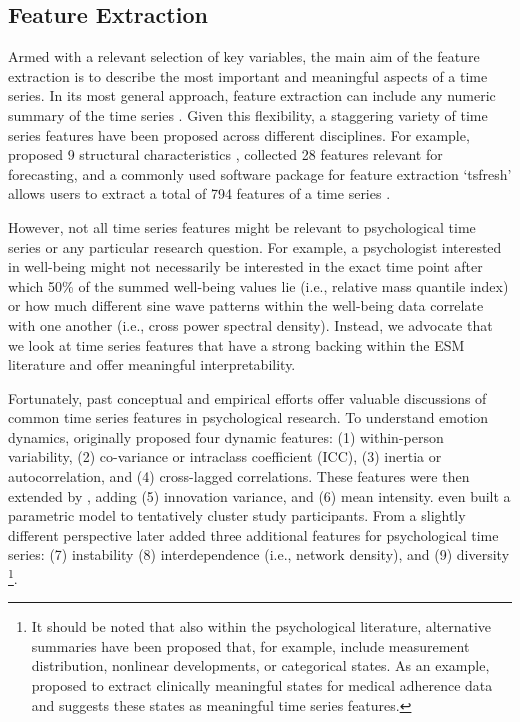 \documentclass[man, 12pt, a4paper, floatsintext]{apa7}
\theoremstyle{break}
\theoremstyle{plain}
\begin{document}



\subsection{Feature Extraction}
Armed with a relevant selection of key variables, the main aim of the feature extraction is to describe the most important and meaningful aspects of a time series. In its most general approach, feature extraction can include any numeric summary of the time series \citep[e.g.,][]{maharaj2019}. Given this flexibility, a staggering variety of time series features have been proposed across different disciplines. For example, \citet{wang2006} proposed 9 structural characteristics \citep[also see][]{fulcher2013}, \citet{adya2001} collected 28 features relevant for forecasting, and a commonly used software package for feature extraction `tsfresh' allows users to extract a total of 794 features of a time series \citep[][]{christ2018}. 

However, not all time series features might be relevant to psychological time series or any particular research question. For example, a psychologist interested in well-being might not necessarily be interested in the exact time point after which 50\% of the summed well-being values lie (i.e., relative mass quantile index) or how much different sine wave patterns within the well-being data correlate with one another (i.e., cross power spectral density). Instead, we advocate that we look at time series features that have a strong backing within the ESM literature and offer meaningful interpretability. 

Fortunately, past conceptual and empirical efforts offer valuable discussions of common time series features in psychological research. To understand emotion dynamics, \citet{kuppens2017} originally proposed four dynamic features: (1) within-person variability, (2) co-variance or intraclass coefficient (ICC), (3) inertia or autocorrelation, and (4) cross-lagged correlations. These features were then extended by \citet{krone2018}, adding (5) innovation variance, and (6) mean intensity. \citet{krone2018} even built a parametric model to tentatively cluster study participants. From a slightly different perspective \citet{dejonckheere2019} later added three additional features for psychological time series: (7) instability (8) interdependence (i.e., network density), and (9) diversity \citep[i.e., Gini coefficient; also see][]{wendt2020}\footnote{It should be noted that also within the psychological literature, alternative summaries have been proposed that, for example, include measurement distribution, nonlinear developments, or categorical states. As an example, \citet{kiwuwa-muyingo2011} proposed to extract clinically meaningful states for medical adherence data and suggests these states as meaningful time series features.}. 
\end{document}

